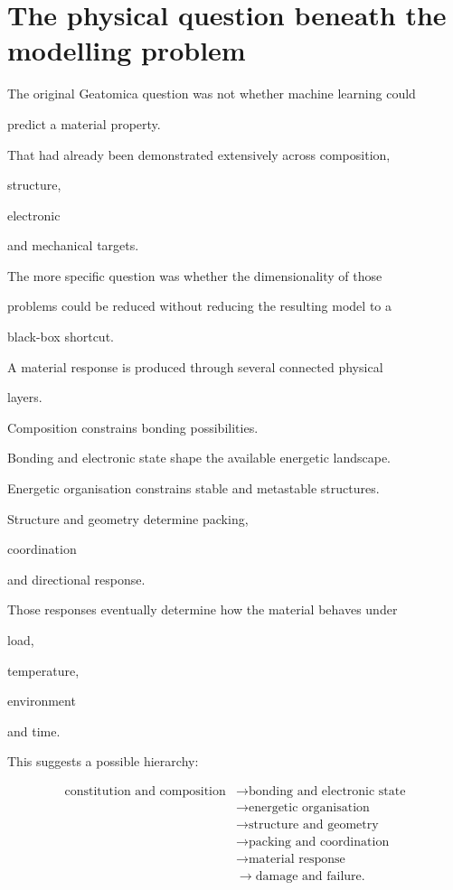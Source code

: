 \documentclass[11pt,a4paper,oneside]{report}
\begin{document}
\section{The physical question beneath the modelling problem}



The original Geatomica question was not whether machine learning could

predict a material property.



That had already been demonstrated extensively across composition,

structure,

electronic

and mechanical targets.



The more specific question was whether the dimensionality of those

problems could be reduced without reducing the resulting model to a

black-box shortcut.



A material response is produced through several connected physical

layers.



Composition constrains bonding possibilities.



Bonding and electronic state shape the available energetic landscape.



Energetic organisation constrains stable and metastable structures.



Structure and geometry determine packing,

coordination

and directional response.



Those responses eventually determine how the material behaves under

load,

temperature,

environment

and time.



This suggests a possible hierarchy:



\begin{equation}
\label{eq:materials-chain}
\begin{aligned}
\text{constitution and composition}
&\rightarrow
\text{bonding and electronic state}
\\
&\rightarrow
\text{energetic organisation}
\\
&\rightarrow
\text{structure and geometry}
\\
&\rightarrow
\text{packing and coordination}
\\
&\rightarrow
\text{material response}
\\
&\rightarrow
\text{damage and failure}.
\end{aligned}
\end{equation}
\end{document}
